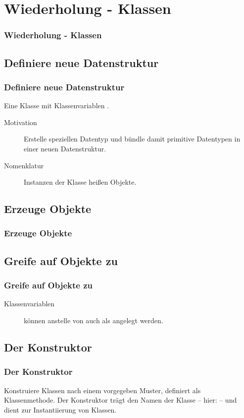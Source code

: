 \def\stitle{Wiederholung - Klassen}
\section{\stitle}
\begin{frame}%
  \frametitle{\stitle}%
\tableofcontents[current]
\end{frame}


\def\sstitle{Definiere neue Datenstruktur}
\subsection{\sstitle}
\begin{frame}%
  \frametitle{\sstitle}%
Eine Klasse  mit Klassenvariablen .

\begin{description}
\item[Motivation]
Erstelle speziellen Datentyp  und b\"undle damit primitive Datentypen  in einer neuen Datenstruktur.
\item[Nomenklatur] Instanzen der Klasse  hei\ss en Objekte.
\end{description}
\end{frame}


\def\sstitle{Erzeuge Objekte}
\subsection{\sstitle}
\begin{frame}%
  \frametitle{\sstitle}%

\end{frame}


\def\sstitle{Greife auf Objekte zu}
\subsection{\sstitle}
\begin{frame}%
  \frametitle{\sstitle}%

\begin{description}
\item[Klassenvariablen] k\"onnen anstelle von  auch als  angelegt werden.
\end{description}
\end{frame}


\def\sstitle{Der Konstruktor}
\subsection{\sstitle}
\begin{frame}%
  \frametitle{\sstitle}%
Konstruiere Klassen nach einem vorgegeben Muster, definiert als Klassenmethode.
Der Konstruktor tr\"agt den Namen der Klasse -- hier:  -- und dient zur Instantiierung von Klassen.

\end{frame}


